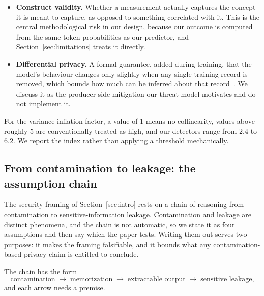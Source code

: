 \begin{itemize}
 identify training members when the member and non-member texts simply differ in some other
 way, such as topic, source, or date of writing. The most common instance is the
 \emph{temporal confound}, where non-members are drawn from a later period than the
 training cutoff, so the detector is really detecting era rather than
 membership~\citep{duan2024mia}. Avoiding this is the main reason we construct members and
 non-members from the same corpus and match them by subset.
 \item \textbf{Construct validity.} Whether a measurement actually captures the concept it
 is meant to capture, as opposed to something correlated with it. This is the central
 methodological risk in our design, because our outcome is computed from the same token
 probabilities as our predictor, and Section~\ref{sec:limitations} treats it directly.
 \item \textbf{Differential privacy.} A formal guarantee, added during training, that the
 model's behaviour changes only slightly when any single training record is removed, which
 bounds how much can be inferred about that record~\citep{abadi2016dp}. We discuss it as the
 producer-side mitigation our threat model motivates and do not implement it.
\end{itemize}

For the variance inflation factor, a value of $1$ means no collinearity, values above
roughly $5$ are conventionally treated as high, and our detectors range from $2.4$ to
$6.2$. We report the index rather than applying a threshold mechanically.

\subsection{From contamination to leakage: the assumption chain}
\label{sec:chain}
The security framing of Section~\ref{sec:intro} rests on a chain of reasoning from
contamination to sensitive-information leakage. Contamination and leakage are distinct
phenomena, and the chain is not automatic, so we state it as four assumptions and then
say which the paper tests. Writing them out serves two purposes: it makes the framing
falsifiable, and it bounds what any contamination-based privacy claim is entitled to
conclude.

The chain has the form
\[
\text{contamination} \;\rightarrow\; \text{memorization} \;\rightarrow\;
\text{extractable output} \;\rightarrow\; \text{sensitive leakage,}
\]
and each arrow needs a premise.

